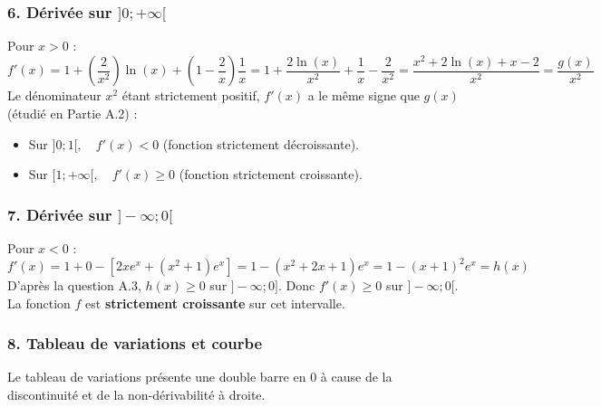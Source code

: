 \documentclass[12pt,a4paper]{article}
\begin{document}
\subsubsection*{6. Dérivée sur $]0; +\infty[$}
Pour $x > 0$ :
\[ f'(x) = 1 + \left(\frac{2}{x^2}\right)\ln(x) + \left(1 - \frac{2}{x}\right)\frac{1}{x} = 1 + \frac{2\ln(x)}{x^2} + \frac{1}{x} - \frac{2}{x^2} = \frac{x^2 + 2\ln(x) + x - 2}{x^2} = \frac{g(x)}{x^2} \]
Le dénominateur $x^2$ étant strictement positif, $f'(x)$ a le même signe que $g(x)$ (étudié en Partie A.2) :
\begin{itemize}
    \item Sur $]0; 1[, \quad f'(x) < 0$ (fonction strictement décroissante).
    \item Sur $[1; +\infty[, \quad f'(x) \ge 0$ (fonction strictement croissante).
\end{itemize}

\subsubsection*{7. Dérivée sur $]-\infty; 0[$}
Pour $x < 0$ :
\[ f'(x) = 1 + 0 - \left[ 2xe^x + (x^2+1)e^x \right] = 1 - (x^2 + 2x + 1)e^x = 1 - (x+1)^2e^x = h(x) \]
D'après la question A.3, $h(x) \ge 0$ sur $]-\infty; 0]$. Donc $f'(x) \ge 0$ sur $]-\infty; 0[$. La fonction $f$ est \textbf{strictement croissante} sur cet intervalle.

\subsubsection*{8. Tableau de variations et courbe}
Le tableau de variations présente une double barre en $0$ à cause de la discontinuité et de la non-dérivabilité à droite.

\begin{center}
\end{center}
\end{document}
